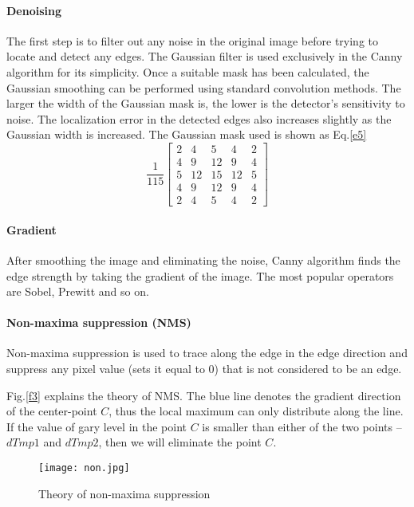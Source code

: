 \documentclass[journal]{IEEEtran}
\begin{document}
\paragraph{Denoising}
The first step is to filter out any noise in the original image before trying to locate and detect any edges. The Gaussian filter is used exclusively in the Canny algorithm for its simplicity. Once a suitable mask has been calculated, the Gaussian smoothing can be performed using standard convolution methods. The larger the width of the Gaussian mask is, the lower is the detector's sensitivity to noise. The localization error in the detected edges also increases slightly as the Gaussian width is increased. The Gaussian mask used is shown as Eq.\ref{e5}
\begin{equation}\label{e5}
\dfrac{1}{115}
\begin{bmatrix}
2 &4  &5&4&2 \\ 
4 & 9 &12&9&4\\ 
5 & 12 &15&12&5\\
4 & 9 &12&9&4\\
2 &4  &5&4&2
\end{bmatrix} 
\end{equation}

\paragraph{Gradient}
After smoothing the image and eliminating the noise, Canny algorithm finds the edge strength by taking the gradient of the image. The most popular operators are Sobel, Prewitt and so on.

\paragraph{Non-maxima suppression (NMS)}
Non-maxima suppression is used to trace along the edge in the edge direction and suppress any pixel value (sets it equal to 0) that is not considered to be an edge.

Fig.\ref{f3} explains the theory of NMS. The blue line denotes the gradient direction of the center-point $C$, thus the local maximum can only distribute along the line. If the value of gary level in the point $C$ is smaller than either of the two points -- $dTmp1 $ and $dTmp2$, then we will eliminate the point $C$.
\begin{figure}[h]
\centering
\texttt{[image: non.jpg]}
\caption{Theory of non-maxima suppression}
\label{f1}
\end{figure}
\end{document}
